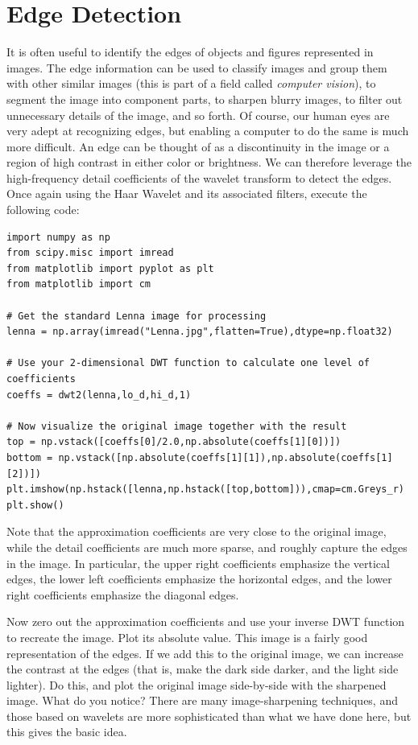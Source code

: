 \section*{Edge Detection}
It is often useful to identify the edges of objects and figures
represented in images. The edge information can be used to classify images
and group them with other similar images (this is part of a field called
\textit{computer vision}), to segment the image into component parts, to
sharpen blurry images, to filter out unnecessary details of the image,
and so forth. Of course, our human eyes are very adept at recognizing edges,
but enabling a computer to do the same is much more difficult. An edge can
be thought of as a discontinuity in the image or a region of high contrast
in either color or brightness. We can therefore leverage the high-frequency
detail coefficients of the wavelet transform to detect the edges. Once again
using the Haar Wavelet and its associated filters, execute the following
code:
\begin{lstlisting}
import numpy as np
from scipy.misc import imread
from matplotlib import pyplot as plt
from matplotlib import cm

# Get the standard Lenna image for processing
lenna = np.array(imread("Lenna.jpg",flatten=True),dtype=np.float32)

# Use your 2-dimensional DWT function to calculate one level of coefficients
coeffs = dwt2(lenna,lo_d,hi_d,1)

# Now visualize the original image together with the result
top = np.vstack([coeffs[0]/2.0,np.absolute(coeffs[1][0])])
bottom = np.vstack([np.absolute(coeffs[1][1]),np.absolute(coeffs[1][2])])
plt.imshow(np.hstack([lenna,np.hstack([top,bottom])),cmap=cm.Greys_r)
plt.show()
\end{lstlisting}

Note that the approximation coefficients are very close to the original
image, while the detail coefficients are much more sparse, and roughly
capture the edges in the image. In particular, the upper right coefficients
emphasize the vertical edges, the lower left coefficients emphasize the
horizontal edges, and the lower right coefficients emphasize the diagonal
edges.

\begin{problem}
Now zero out the approximation coefficients and use your inverse DWT
function to recreate the image. Plot its absolute value. This image is
a fairly good representation of the edges. If we add this to the original
image, we can increase the contrast at the edges (that is, make the dark
side darker, and the light side lighter). Do this, and plot the original
image side-by-side with the sharpened image. What do you notice? There
are many image-sharpening techniques, and those based on wavelets
are more sophisticated than what we have done here, but this gives the
basic idea.
\end{problem}

